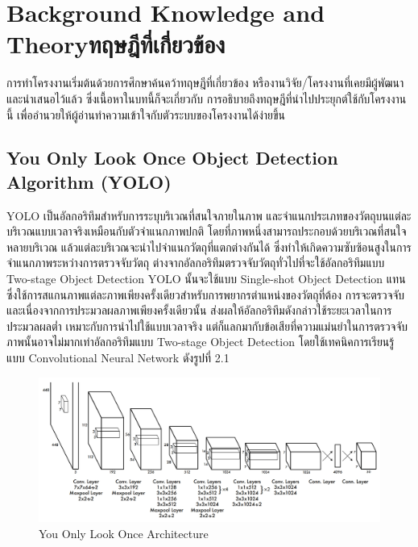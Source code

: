 \chapter{\ifenglish Background Knowledge and Theory\else ทฤษฎีที่เกี่ยวข้อง\fi}

การทําโครงงานเริ่มต้นด้วยการศึกษาค้นคว้าทฤษฎีที่เกี่ยวข้อง หรืองานวิจัย/โครงงานที่เคยมีผู้พัฒนาและนําเสนอไว้แล้ว ซึ่งเนื้อหาในบทนี้ก็จะเกี่ยวกับ
การอธิบายถึงทฤษฎีที่นำไปประยุกต์ใช้กับโครงงานนี้ เพื่ออำนวยให้ผู้อ่านทำความเข้าใจกับตัวระบบของโครงงานได้ง่ายขึ้น

\section{You Only Look Once Object Detection Algorithm (YOLO)}
YOLO \cite{yolo} เป็นอัลกอริทึมสำหรับการระบุบริเวณที่สนใจภายในภาพ และจำแนกประเภทของวัตถุบนแต่ละบริเวณแบบเวลาจริงเหมือนกับตัวจำแนกภาพปกติ 
โดยที่ภาพหนึ่งสามารถประกอบด้วยบริเวณที่สนใจหลายบริเวณ แล้วแต่ละบริเวณจะนำไปจำแนกวัตถุที่แตกต่างกันได้ ซึ่งทำให้เกิดความซับซ้อนสูงในการ
จำแนกภาพระหว่างการตรวจจับวัตถุ ต่างจากอัลกอริทึมตรวจจับวัตถุทั่วไปที่จะใช้อัลกอริทึมแบบ Two-stage Object Detection YOLO 
นั้นจะใช้แบบ Single-shot Object Detection แทน ซึ่งใช้การสแกนภาพแต่ละภาพเพียงครั้งเดียวสำหรับการพยากรตำแหน่งของวัตถุที่ต้อง
การจะตรวจจับ และเนื่องจากการประมวลผลภาพเพียงครั้งเดียวนั้น ส่งผลให้อัลกอริทึมดังกล่าวใช้ระยะเวลาในการประมวลผลต่ำ 
เหมาะกับการนำไปใช้แบบเวลาจริง แต่ก็แลกมากับข้อเสียที่ความแม่นยำในการตรวจจับภาพนั้นอาจไม่มากเท่าอัลกอริทึมแบบ Two-stage Object Detection 
โดยใช้เทคนิคการเรียนรู้แบบ Convolutional Neural Network ดังรูปที่ 2.1
\begin{figure}[ht]
  \begin{center}
  \includegraphics[scale=0.2]{resources/YOLO.png}
  \end{center}
  \caption[YOLO Architecture]{You Only Look Once Architecture}
  \label{fig:yolo architecture}
\end{figure}



